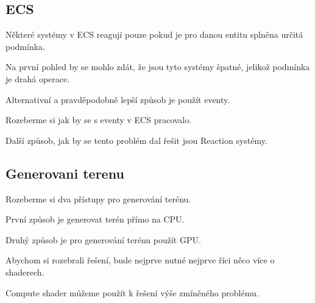 \subsection{ECS}

Některé systémy v ECS reagují pouze pokud je pro danou entitu splněna určitá podmínka.

Na první pohled by se mohlo zdát, že jsou tyto systémy špatné, jelikož podmínka je drahá operace.

Alternativní a pravděpodobně lepší způsob je použít eventy.

Rozeberme si jak by se s eventy v ECS pracovalo.

Další způsob, jak by se tento problém dal řešit jsou Reaction systémy.


\subsection{Generovani terenu}

Rozeberme si dva přístupy pro generování terénu.

První způsob je generovat terén přímo na CPU.

Druhý způsob je pro generování terénu použít GPU.


Abychom si rozebrali řešení, bude nejprve nutné nejprve říci něco více o shaderech.

Compute shader můžeme použít k řešení výše zmíněného problému.


